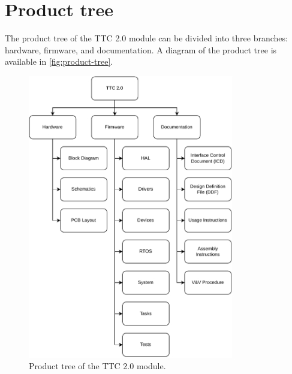 \section{Product tree}

The product tree of the TTC 2.0 module can be divided into three branches: hardware, firmware, and documentation. A diagram of the product tree is available in \autoref{fig:product-tree}.

\begin{figure}[!ht]
    \begin{center}
        \includegraphics[width=0.8\textwidth]{figures/product-tree.pdf}
        \caption{Product tree of the TTC 2.0 module.}
        \label{fig:product-tree}
    \end{center}
\end{figure}

